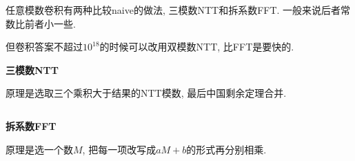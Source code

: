 任意模数卷积有两种比较naive的做法, 三模数NTT和拆系数FFT. 一般来说后者常数比前者小一些.

但卷积答案不超过$10^18$的时候可以改用双模数NTT, 比FFT是要快的.

\textbf{三模数NTT}

原理是选取三个乘积大于结果的NTT模数, 最后中国剩余定理合并.

\inputminted[]{cpp}{../src/math/三模数NTT.cpp}

\textbf{拆系数FFT}

原理是选一个数$M$, 把每一项改写成$a M + b$的形式再分别相乘.

\inputminted[]{cpp}{../src/math/拆系数FFT.cpp}